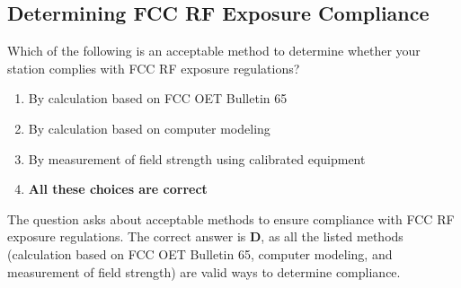 \subsection{Determining FCC RF Exposure Compliance}
\label{T0C06}

\begin{tcolorbox}[colback=gray!10!white,colframe=black!75!black,title=T0C06]
Which of the following is an acceptable method to determine whether your station complies with FCC RF exposure regulations?
\begin{enumerate}[noitemsep]
    \item By calculation based on FCC OET Bulletin 65
    \item By calculation based on computer modeling
    \item By measurement of field strength using calibrated equipment
    \item \textbf{All these choices are correct}
\end{enumerate}
\end{tcolorbox}

The question asks about acceptable methods to ensure compliance with FCC RF exposure regulations. The correct answer is \textbf{D}, as all the listed methods (calculation based on FCC OET Bulletin 65, computer modeling, and measurement of field strength) are valid ways to determine compliance.
